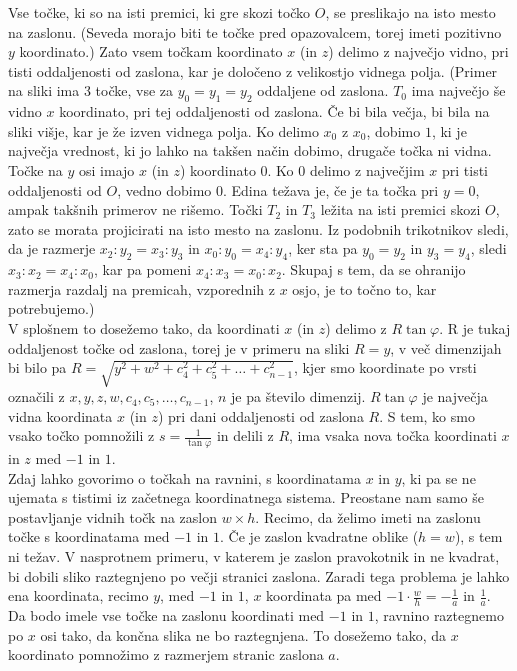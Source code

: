 \documentclass[a4paper, 12px]{article}
\begin{document}
    Vse točke, ki so na isti premici, ki gre skozi točko $O$, se preslikajo na isto mesto na zaslonu.
    (Seveda morajo biti te točke pred opazovalcem, torej imeti pozitivno $y$ koordinato.)
    Zato vsem točkam koordinato $x$ (in $z$) delimo z največjo vidno, pri tisti oddaljenosti od zaslona, kar je
    določeno z velikostjo vidnega polja.
    (Primer na sliki ima 3 točke, vse za $y_0 = y_1 = y_2$ oddaljene od zaslona. $T_0$ ima največjo še vidno $x$
    koordinato, pri tej oddaljenosti od zaslona. Če bi bila večja, bi bila na sliki višje, kar je že izven vidnega polja.
    Ko delimo $x_0$ z $x_0$, dobimo $1$, ki je največja vrednost, ki jo lahko na takšen način dobimo, drugače točka ni vidna.
    Točke na $y$ osi imajo $x$ (in $z$) koordinato $0$. Ko $0$ delimo z največjim $x$ pri tisti oddaljenosti od $O$, 
    vedno dobimo $0$. Edina težava je, če je ta točka pri $y = 0$, ampak takšnih primerov ne rišemo.
    Točki $T_2$ in $T_3$ ležita na isti premici skozi $O$, zato se morata projicirati na isto mesto na zaslonu.
    Iz podobnih trikotnikov sledi, da je razmerje $x_2 : y_2 = x_3 : y_3$ in $x_0 : y_0 = x_4 : y_4$,
    ker sta pa $y_0 = y_2$ in $y_3 = y_4$, sledi $x_3 : x_2 = x_4 : x_0$, kar pa pomeni $x_4 : x_3 = x_0 : x_2$.
    Skupaj s tem, da se ohranijo razmerja razdalj na premicah, vzporednih z $x$ osjo, je to točno to, kar potrebujemo.)\\

    V splošnem to dosežemo tako, da koordinati $x$ (in $z$) delimo z $R\tan{\varphi}$. R je tukaj oddaljenost točke od zaslona,
    torej je v primeru na sliki $R = y$, v več dimenzijah bi bilo pa $R = \sqrt{y^2 + w^2 + c_4^2 + c_5^2 + \dots + c_{n-1}^2}$,
    kjer smo koordinate po vrsti označili z $x, y, z, w, c_4, c_5, \dots, c_{n-1}$, $n$ je pa število dimenzij.
    $R\tan{\varphi}$ je največja vidna koordinata $x$ (in $z$) pri dani oddaljenosti od zaslona $R$.
    S tem, ko smo vsako točko pomnožili z $s = \frac{1}{\tan{\varphi}}$ in delili z $R$, ima vsaka nova točka koordinati $x$ in $z$ med $-1$ in $1$. \\

    Zdaj lahko govorimo o točkah na ravnini, s koordinatama $x$ in $y$, ki pa se ne ujemata s tistimi iz začetnega koordinatnega sistema.
    Preostane nam samo še postavljanje vidnih točk na zaslon $w \times h$. Recimo, da želimo imeti na zaslonu
    točke s koordinatama med $-1$ in $1$. Če je zaslon kvadratne oblike ($h = w$), s tem ni težav. V nasprotnem primeru,
    v katerem je zaslon pravokotnik in ne kvadrat, bi dobili sliko raztegnjeno po večji stranici zaslona. Zaradi tega problema je 
    lahko ena koordinata, recimo $y$, med $-1$ in $1$, $x$ koordinata pa med $-1 \cdot \frac{w}{h} = -\frac{1}{a}$ in $\frac{1}{a}$.
    Da bodo imele vse točke na zaslonu koordinati med $-1$ in $1$, ravnino raztegnemo po $x$ osi tako, da končna slika ne bo 
    raztegnjena. To dosežemo tako, da $x$ koordinato pomnožimo z razmerjem stranic zaslona $a$.\\
\end{document}
